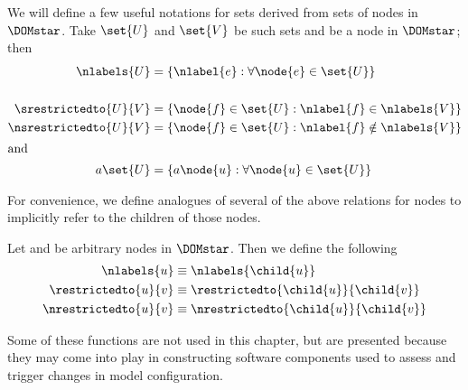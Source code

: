\begin{definition}\label{useful-set-functions}
  We will define a few useful notations for sets derived from sets of
  nodes in $\DOMstar$. Take \(\set{U}\) and \(\set{V}\) be such sets and
   be a node in $\DOMstar$; then 
  \begin{align*}
      \nlabels{U} &= \{\nlabel{e}: \forall \node{e} \in \set{U}\} \notag\\
      & \notag\\
      \srestrictedto{U}{V} &= \{\node{f} \in \set{U}: \nlabel{f} \in \nlabels{V} \} \notag\\
      \nsrestrictedto{U}{V} &= \{ \node{f} \in \set{U}: \nlabel{f} \notin \nlabels{V} \} \label{restrictions}\notag\\
      \intertext{and}
      a \set{U} &= \{a \node{u}: \forall \node{u} \in \set{U}\} \notag
  \end{align*}
\end{definition}

\begin{definition}\label{useful-node-functions}
  For convenience, we define analogues of several of the above
  relations for nodes to implicitly refer to the children of
  those nodes.

  Let  and  be arbitrary nodes in $\DOMstar$.  Then we
  define the following
  \begin{align*}
      \nlabels{u} &\equiv \nlabels{\child{u}}\\
      \restrictedto{u}{v} &\equiv \restrictedto{\child{u}}{\child{v}}\\
      \nrestrictedto{u}{v} &\equiv \nrestrictedto{\child{u}}{\child{v}}
  \end{align*}
\end{definition}



Some of these functions are not used in this chapter, but are
presented because they may come into play in constructing software
components used to assess and trigger changes in model configuration. 


    

